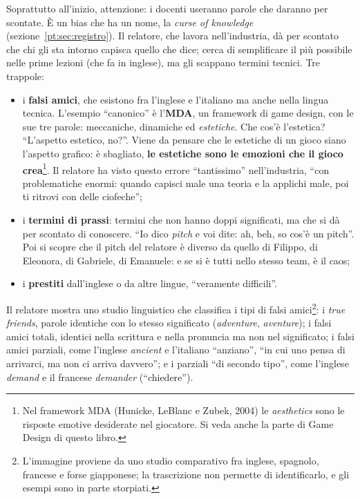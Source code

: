 Soprattutto all'inizio, attenzione: i docenti useranno parole che daranno per
scontate. È un bias che ha un nome, la \emph{curse of knowledge}
(sezione~\ref{pt:sec:registro}). Il relatore, che lavora nell'industria, dà
per scontato che chi gli sta intorno capisca quello che dice; cerca di
semplificare il più possibile nelle prime lezioni (che fa in inglese), ma gli
scappano termini tecnici. Tre trappole:
\begin{itemize}
  \item i \textbf{falsi amici}, che esistono fra l'inglese e l'italiano ma anche
        nella lingua tecnica. L'esempio ``canonico'' è l'\textbf{MDA}, un
        framework di game design, con le sue tre parole: meccaniche, dinamiche
        ed \emph{estetiche}. Che cos'è l'estetica? ``L'aspetto estetico,
        no?''. Viene da pensare che le estetiche di un gioco siano l'aspetto
        grafico: è sbagliato, \textbf{le estetiche sono le emozioni che il
        gioco crea}\footnote{Nel framework MDA (Hunicke, LeBlanc e Zubek, 2004)
        le \emph{aesthetics} sono le risposte emotive desiderate nel giocatore.
        Si veda anche la parte di Game Design di questo libro.}. Il relatore ha
        visto questo errore ``tantissimo'' nell'industria, ``con problematiche
        enormi: quando capisci male una teoria e la applichi male, poi ti
        ritrovi con delle ciofeche'';
  \item i \textbf{termini di prassi}: termini che non hanno doppi significati, ma
        che si dà per scontato di conoscere. ``Io dico \emph{pitch} e voi dite:
        ah, beh, so cos'è un pitch''. Poi si scopre che il pitch del relatore è
        diverso da quello di Filippo, di Eleonora, di Gabriele, di Emanuele: e
        se si è tutti nello stesso team, è il caos;
  \item i \textbf{prestiti} dall'inglese o da altre lingue, ``veramente
        difficili''.
\end{itemize}
Il relatore mostra uno studio linguistico che classifica i tipi di falsi
amici\footnote{L'immagine proviene da uno studio comparativo fra inglese,
spagnolo, francese e forse giapponese; la trascrizione non permette di
identificarlo, e gli esempi sono in parte storpiati.}: i \emph{true friends},
parole identiche con lo stesso significato (\emph{adventure},
\emph{aventure}); i falsi amici totali, identici nella scrittura e nella
pronuncia ma non nel significato; i falsi amici parziali, come l'inglese
\emph{ancient} e l'italiano ``anziano'', ``in cui uno pensa di arrivarci, ma
non ci arriva davvero''; e i parziali ``di secondo tipo'', come l'inglese
\emph{demand} e il francese \emph{demander} (``chiedere'').

